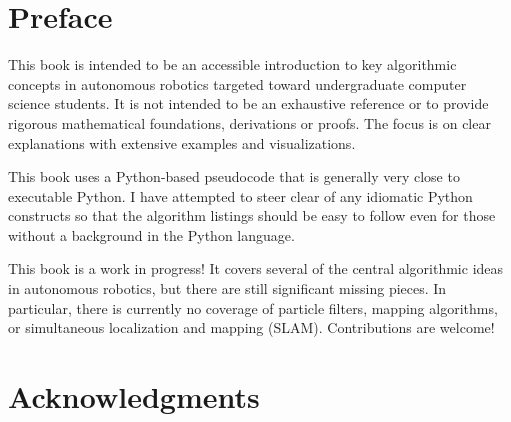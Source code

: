 \documentclass[11pt,fleqn]{book} %
\begin{document}
\pagestyle{empty} %

\tableofcontents %

\cleardoublepage %

\pagestyle{fancy} %





\chapter*{Preface}

This book is intended to be an accessible introduction to key
algorithmic concepts in autonomous robotics targeted toward
undergraduate computer science students.  It is not intended to be an
exhaustive reference or to provide rigorous mathematical foundations,
derivations or proofs.  The focus is on clear explanations with
extensive examples and visualizations.

This book uses a Python-based pseudocode that is generally very close
to executable Python. I have attempted to steer clear of any idiomatic
Python constructs so that the algorithm listings should be easy to
follow even for those without a background in the Python language.

This book is a work in progress!  It covers several of the central
algorithmic ideas in autonomous robotics, but there are still
significant missing pieces.  In particular, there is currently no
coverage of particle filters, mapping algorithms, or simultaneous
localization and mapping (SLAM). Contributions are welcome!


\chapter*{Acknowledgments}
\end{document}
